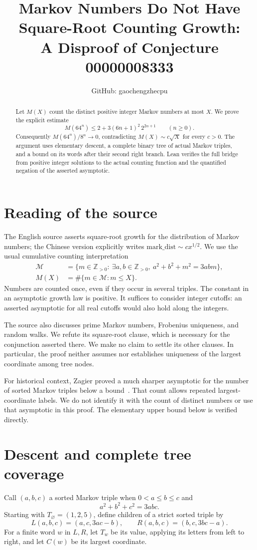 \documentclass[11pt]{article}
\title{Markov Numbers Do Not Have Square-Root Counting Growth:\\A Disproof of Conjecture 00000008333}
\author{GitHub: gaochengzhecpu}
\date{}
\begin{document}
\maketitle
\begin{abstract}
Let $M(X)$ count the distinct positive integer Markov numbers at most
$X$. We prove the explicit estimate
\[
 M(64^n)\le 2+3(6n+1)^2\,2^{2n+1}\qquad(n\ge0).
\]
Consequently $M(64^n)/8^n\longrightarrow0$, contradicting
$M(X)\sim c\sqrt X$ for every $c>0$. The argument uses elementary
descent, a complete binary tree of actual Markov triples, and a bound
on its words after their second right branch. Lean verifies the full
bridge from positive integer solutions to the actual counting function
and the quantified negation of the asserted asymptotic.
\end{abstract}

\section*{Reading of the source}
The English source asserts square-root growth for the distribution
of Markov numbers; the Chinese version explicitly writes
$\mathrm{mark\_dist}\sim c x^{1/2}$. We use the usual cumulative
counting interpretation
\[
\begin{split}
\mathcal M&=\{m\in\mathbb Z_{>0}:\ \exists a,b\in\mathbb Z_{>0},\
 a^2+b^2+m^2=3abm\},\\
M(X)&=\#\{m\in\mathcal M:m\le X\}.
\end{split}
\]
Numbers are counted once, even if they occur in several triples. The
constant in an asymptotic growth law is positive. It suffices to
consider integer cutoffs: an asserted asymptotic for all real cutoffs
would also hold along the integers.

The source also discusses prime Markov numbers, Frobenius uniqueness,
and random walks. We refute its square-root clause, which is necessary
for the conjunction asserted there. We make no claim to settle its
other clauses. In particular, the proof neither assumes nor establishes
uniqueness of the largest coordinate among tree nodes.

For historical context, Zagier proved a much sharper asymptotic for
the number of sorted Markov triples below a bound~\cite{zagier}.
That count allows repeated largest-coordinate labels. We do not
identify it with the count of distinct numbers or use that asymptotic
in this proof. The elementary upper bound below is verified directly.

\section*{Descent and complete tree coverage}
Call $(a,b,c)$ a sorted Markov triple when $0<a\le b\le c$ and
\begin{equation}\label{eq:markov}
 a^2+b^2+c^2=3abc.
\end{equation}
Starting with $T_\varnothing=(1,2,5)$, define children of a strict
sorted triple by
\[
 L(a,b,c)=(a,c,3ac-b),\qquad
 R(a,b,c)=(b,c,3bc-a).
\]
For a finite word $w$ in $L,R$, let $T_w$ be its value, applying its
letters from left to right, and let $C(w)$ be its largest coordinate.
\end{document}
